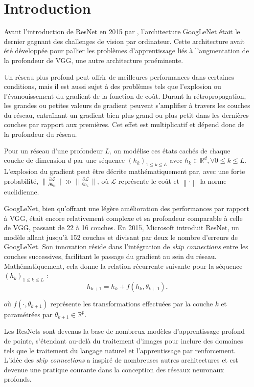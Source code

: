 \chapter{Introduction}
Avant l'introduction de ResNet en 2015 par \citeauthor{resnet}, l'architecture GoogLeNet était le dernier gagnant des challenges de vision par ordinateur. Cette architecture avait été développée pour pallier les problèmes d'apprentissage liés à l'augmentation de la profondeur de VGG, une autre architecture proéminente.

Un réseau plus profond peut offrir de meilleures performances dans certaines conditions, mais il est aussi sujet à des problèmes tels que l'explosion ou l'évanouissement du gradient de la fonction de coût. Durant la rétropropagation, les grandes ou petites valeurs de gradient peuvent s'amplifier à travers les couches du réseau, entraînant un gradient bien plus grand ou plus petit dans les dernières couches par rapport aux premières. Cet effet est multiplicatif et dépend donc de la profondeur du réseau.

Pour un réseau d'une profondeur $L$, on modélise ces états cachés de chaque couche de dimension $d$ par une séquence $(h_k)_{1 \leqslant k \leqslant L}$ avec $h_k \in \mathbb{R}^d, \forall 0 \leqslant k \leqslant L$. L'explosion du gradient peut être décrite mathématiquement par, avec une forte probabilité, $\| \frac{\partial \mathscr{L}}{\partial h_0} \| \gg \| \frac{\partial \mathscr{L}}{\partial h_L} \|$, où $\mathscr{L}$ représente le coût et $\left\| \cdot \right\|$ la norme euclidienne.

GoogLeNet, bien qu'offrant une légère amélioration des performances par rapport à VGG, était encore relativement complexe et sa profondeur comparable à celle de VGG, passant de 22 à 16 couches. En 2015, Microsoft introduit ResNet, un modèle allant jusqu'à 152 couches et divisant par deux le nombre d'erreurs de GoogLeNet. Son innovation réside dans l'intégration de \textit{skip connections} entre les couches successives, facilitant le passage du gradient au sein du réseau. Mathématiquement, cela donne la relation récurrente suivante pour la séquence $(h_k)_{1 \leqslant k \leqslant L}$ :
\[
    h_{k+1} = h_k + f(h_k, \theta_{k+1})
.\]

où $f(\cdot, \theta_{k+1})$ représente les transformations effectuées par la couche $k$ et paramétrées par $\theta_{k+1} \in \mathbb{R}^p$.

Les ResNets sont devenus la base de nombreux modèles d'apprentissage profond de pointe, s'étendant au-delà du traitement d'images pour inclure des domaines tels que le traitement du langage naturel et l'apprentissage par renforcement. L'idée des \textit{skip connections} a inspiré de nombreuses autres architectures et est devenue une pratique courante dans la conception des réseaux neuronaux profonds.

